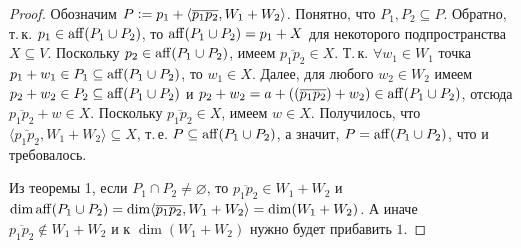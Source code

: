 \begin{proof}
    Обозначим $P \vcentcolon = p_1 + \langle\overline{p_1p_2}, W_1 + W_2\rangle$. Понятно, что $P_1, P_2 \subseteq P$. Обратно, т.\,к. $p_1 \in \operatorname{aff}(P_1 \cup P_2)$, то $\operatorname{aff}(P_1 \cup P_2) = p_1 + X$ для некоторого подпространства $X \subseteq V$. Поскольку $p_2 \in \operatorname{aff}(P_1 \cup P_2)$, имеем $\overline{p_1p_2} \in X$. Т.\,к. $\forall w_1 \in W_1$ точка $p_1 + w_1 \in P_1 \subseteq \operatorname{aff}(P_1 \cup P_2)$, то $w_1 \in X$. Далее, для любого $w_2 \in W_2$ имеем $p_2 + w_2 \in P_2 \subseteq \operatorname{aff}(P_1 \cup P_2)$ и $p_2 + w_2 = a + ((\overline{p_1p_2}) + w_2) \in \operatorname{aff}(P_1 \cup P_2)$, отсюда $\overline{p_1p_2} + w \in X$. Поскольку $\overline{p_1p_2} \in X$, имеем $w \in X$. Получилось, что $\langle\overline{p_1p_2}, W_1 + W_2\rangle \subseteq X$, т.\,е. $P \subseteq \operatorname{aff}(P_1 \cup P_2)$, а значит, $P = \operatorname{aff}(P_1 \cup P_2)$, что и требовалось.

    Из теоремы 1, если $P_1 \cap P_2 \ne \varnothing$, то $\overline{p_1p_2} \in W_1 + W_2$ и $\dim\operatorname{aff}(P_1 \cup P_2) = \dim\langle\overline{p_1p_2}, W_1 + W_2\rangle = \dim(W_1 + W_2)$. А иначе $\overline{p_1p_2} \notin W_1 + W_2$ и к $\dim(W_1 + W_2)$ нужно будет прибавить $1$.
\end{proof}

